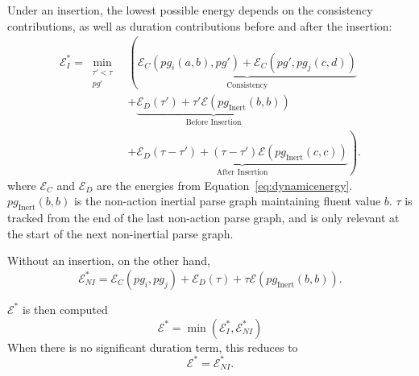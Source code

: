 \documentclass[10pt,journal,letterpaper,compsoc]{IEEEtran}
\begin{document}
Under an insertion, the lowest possible energy depends on the consistency contributions, as well as duration contributions before and after the insertion:
\begin{equation}\begin{split}
\mathcal{E}^{*}_I = \min_{\substack{ \tau' < \tau \\ pg'}} & \left(  \underbrace{ \mathcal{E}_C  (pg_{i}(a,b), pg') + \mathcal{E}_C (pg', pg_j(c,d))}_{\textrm{Consistency}} \right. \\ 
& +\underbrace{\mathcal{E}_D (\tau') + \tau' \mathcal{E}(pg_{\mathrm{Inert}} (b,b))}_{\textrm{Before Insertion}} \\
& \left. +\underbrace{ \mathcal{E}_D (\tau - \tau')+ (\tau - \tau') \mathcal{E} (pg_{\mathrm{Inert}} (c,c))}_{\textrm{After Insertion}} \right).
\end{split}
\label{eq:e_star_i}
\end{equation}
where $\mathcal{E}_C$ and $\mathcal{E}_D$ are the energies from Equation~\ref{eq:dynamicenergy}.  $pg_{\mathrm{Inert}} (b,b)$ is the non-action inertial parse graph maintaining fluent value $b$.  $\tau$ is tracked from the end of the last non-action parse graph, and is only relevant at the start of the next non-inertial parse graph.

Without an insertion, on the other hand, 
\begin{equation}
\mathcal{E}^{*}_{NI} =  \mathcal{E}_C (pg_{i}, pg_j)  + \mathcal{E}_D (\tau) +\tau \mathcal{E}(pg_{\mathrm{Inert}} (b,b)) .
\label{eq:e_star_ni}
\end{equation}

$\mathcal{E}^{*}$ is then computed
\begin{equation}
\mathcal{E}^{*}  = \min\left(\mathcal{E}^{*}_I, \mathcal{E}^{*}_{NI} \right)
\label{eq:e_star}
\end{equation}
When there is no significant duration term, this reduces to
\begin{equation}
\mathcal{E}^{*} = \mathcal{E}^{*}_{NI}.
\end{equation}


\end{document}
